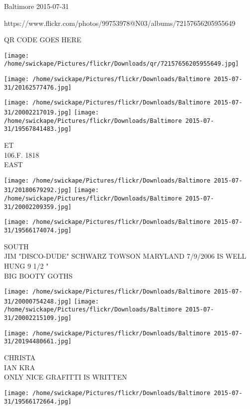 \documentclass[10pt,letterpaper]{article}
\begin{document}
Baltimore 2015-07-31

https://www.flickr.com/photos/99753978@N03/albums/72157656205955649

QR CODE GOES HERE

\texttt{[image: /home/swickape/Pictures/flickr/Downloads/qr/72157656205955649.jpg]}
\pagebreak

\texttt{[image: /home/swickape/Pictures/flickr/Downloads/Baltimore 2015-07-31/20162577476.jpg]}

\vspace{0.25in}
\texttt{[image: /home/swickape/Pictures/flickr/Downloads/Baltimore 2015-07-31/20002217019.jpg]}
\texttt{[image: /home/swickape/Pictures/flickr/Downloads/Baltimore 2015-07-31/19567841483.jpg]}

ET\\
106.F. 1818\\
EAST\\
\pagebreak

\texttt{[image: /home/swickape/Pictures/flickr/Downloads/Baltimore 2015-07-31/20180679292.jpg]}
\texttt{[image: /home/swickape/Pictures/flickr/Downloads/Baltimore 2015-07-31/20002209359.jpg]}

\vspace{0.25in}
\texttt{[image: /home/swickape/Pictures/flickr/Downloads/Baltimore 2015-07-31/19566174074.jpg]}

SOUTH\\
JIM "DISCO{-}DUDE" SCHWARZ TOWSON MARYLAND 7/9/2006 IS WELL HUNG 9 1/2 "\\
BIG BOOTY GOTHS\\
\pagebreak

\texttt{[image: /home/swickape/Pictures/flickr/Downloads/Baltimore 2015-07-31/20000754248.jpg]}
\texttt{[image: /home/swickape/Pictures/flickr/Downloads/Baltimore 2015-07-31/20002215109.jpg]}

\texttt{[image: /home/swickape/Pictures/flickr/Downloads/Baltimore 2015-07-31/20194480661.jpg]}

CHRISTA\\
IAN KRA\\
ONLY NICE GRAFITTI IS WRITTEN\\
\pagebreak

\texttt{[image: /home/swickape/Pictures/flickr/Downloads/Baltimore 2015-07-31/19566172664.jpg]}
\end{document}
